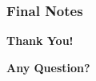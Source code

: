 \documentclass[compress,oilve]{beamer}
\begin{document}
	





\frametitle{Final Notes}
\centering
\vspace{50 pt}
\textbf{Thank You!}
\vspace{50pt}

\textbf{Any Question?}
\end{document}
